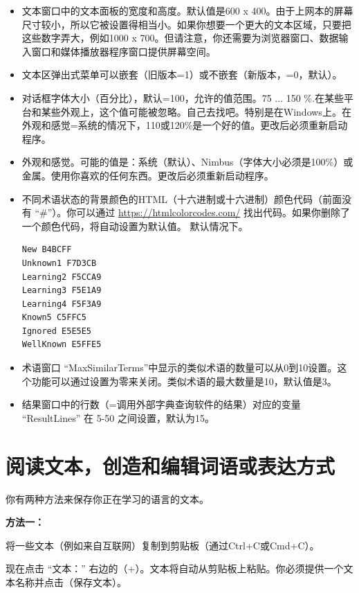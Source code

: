 \documentclass[cn,10pt,math=newtx,citestyle=gb7714-2015,bibstyle=gb7714-2015]{elegantbook}
\begin{document}
\begin{itemize}
    \item 文本窗口中的文本面板的宽度和高度。默认值是600 x 400。由于上网本的屏幕尺寸较小，所以它被设置得相当小。如果你想要一个更大的文本区域，只要把这些数字弄大，例如1000 x 700。但请注意，你还需要为浏览器窗口、数据输入窗口和媒体播放器程序窗口提供屏幕空间。

     \item 文本区弹出式菜单可以嵌套（旧版本=1）或不嵌套（新版本，=0，默认）。
     \item 对话框字体大小（百分比），默认=100，允许的值范围。75 ... 150 \%.在某些平台和某些外观上，这个值可能被忽略。自己去找吧。特别是在Windows上。在外观和感觉=系统的情况下，110或120\%是一个好的值。更改后必须重新启动程序。
     \item 外观和感觉。可能的值是：系统（默认）、Nimbus（字体大小必须是100\%）或金属。使用你喜欢的任何东西。更改后必须重新启动程序。
     \item  不同术语状态的背景颜色的HTML（十六进制或十六进制）颜色代码（前面没有 “\#”）。你可以通过 \url{https://htmlcolorcodes.com/} 找出代码。如果你删除了一个颜色代码，将自动设置为默认值。
     默认情况下。
     \begin{lstlisting}
New B4BCFF
Unknown1 F7D3CB
Learning2 F5CCA9
Learning3 F5E1A9
Learning4 F5F3A9
Known5 C5FFC5
Ignored E5E5E5
WellKnown E5FFE5
     \end{lstlisting}

     \item 术语窗口 “MaxSimilarTerms”中显示的类似术语的数量可以从0到10设置。这个功能可以通过设置为零来关闭。类似术语的最大数量是10，默认值是3。
     \item 结果窗口中的行数（=调用外部字典查询软件的结果）对应的变量 “ResultLines” 在 5-50 之间设置，默认为15。
\end{itemize}

\chapter{阅读文本，创造和编辑词语或表达方式}\label{阅读文本，创造和编辑词语或表达方式}
你有两种方法来保存你正在学习的语言的文本。

\textbf{方法一：}

将一些文本（例如来自互联网）复制到剪贴板（通过Ctrl+C或Cmd+C）。

现在点击 “文本：” 右边的（+）。文本将自动从剪贴板上粘贴。你必须提供一个文本名称并点击（保存文本）。
\end{document}
